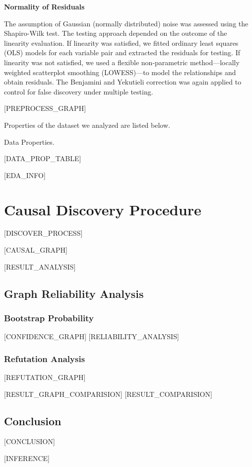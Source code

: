 \documentclass{article}
\begin{document}
\textbf{Normality of Residuals}

The assumption of Gaussian (normally distributed) noise was assessed using the Shapiro-Wilk test. 
The testing approach depended on the outcome of the linearity evaluation. 
If linearity was satisfied, we fitted ordinary least squares (OLS) models for each variable pair and extracted the residuals for testing. 
If linearity was not satisfied, we used a flexible non-parametric method—locally weighted scatterplot smoothing (LOWESS)—to model the relationships and obtain residuals. 
The Benjamini and Yekutieli correction was again applied to control for false discovery under multiple testing.



[PREPROCESS_GRAPH]


Properties of the dataset we analyzed are listed below.

\begin{table}[H]
    \centering
    \caption{Data Properties.}
[DATA_PROP_TABLE]
\end{table}

[EDA_INFO]

\section{Causal Discovery Procedure}
[DISCOVER_PROCESS]

[CAUSAL_GRAPH]

[RESULT_ANALYSIS]

\subsection{Graph Reliability Analysis}

\subsubsection{Bootstrap Probability}
[CONFIDENCE_GRAPH]
[RELIABILITY_ANALYSIS]

\subsubsection{Refutation Analysis}
[REFUTATION_GRAPH]

[RESULT_GRAPH_COMPARISION]
[RESULT_COMPARISION]

\subsection{Conclusion}
[CONCLUSION]

[INFERENCE]
\end{document}
